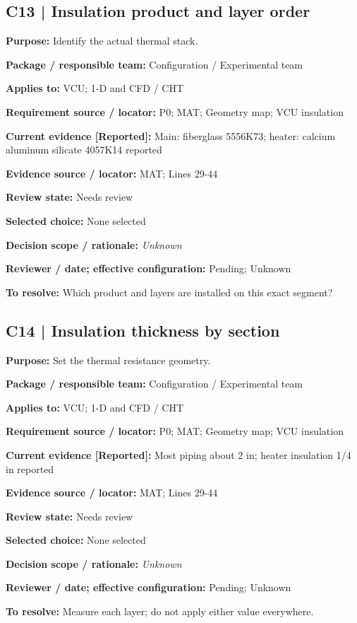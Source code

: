 \documentclass[11pt]{article}
\begin{document}
\par\noindent\begin{minipage}{\textwidth}\small\setlength{\parskip}{2pt}
\subsection*{C13 | Insulation product and layer order}
\textbf{Purpose:} Identify the actual thermal stack.\par
\textbf{Package / responsible team:} Configuration / Experimental team\par
\textbf{Applies to:} VCU; 1-D and CFD / CHT\par
\textbf{Requirement source / locator:} P0; MAT; Geometry map; VCU insulation\par
\textbf{Current evidence [Reported]:} Main: fiberglass 5556K73; heater: calcium aluminum silicate 4057K14 reported\par
\textbf{Evidence source / locator:} MAT; Lines 29-44\par
\textbf{Review state:} Needs review\par
\textbf{Selected choice:} None selected\par
\textbf{Decision scope / rationale:} \textit{Unknown}\par
\textbf{Reviewer / date; effective configuration:} Pending; Unknown\par
\textbf{To resolve:} Which product and layers are installed on this exact segment?\par
\end{minipage}\par\vspace{5pt}
\par\noindent\begin{minipage}{\textwidth}\small\setlength{\parskip}{2pt}
\subsection*{C14 | Insulation thickness by section}
\textbf{Purpose:} Set the thermal resistance geometry.\par
\textbf{Package / responsible team:} Configuration / Experimental team\par
\textbf{Applies to:} VCU; 1-D and CFD / CHT\par
\textbf{Requirement source / locator:} P0; MAT; Geometry map; VCU insulation\par
\textbf{Current evidence [Reported]:} Most piping about 2 in; heater insulation 1/4 in reported\par
\textbf{Evidence source / locator:} MAT; Lines 29-44\par
\textbf{Review state:} Needs review\par
\textbf{Selected choice:} None selected\par
\textbf{Decision scope / rationale:} \textit{Unknown}\par
\textbf{Reviewer / date; effective configuration:} Pending; Unknown\par
\textbf{To resolve:} Measure each layer; do not apply either value everywhere.\par
\end{minipage}\par\vspace{5pt}
\end{document}
